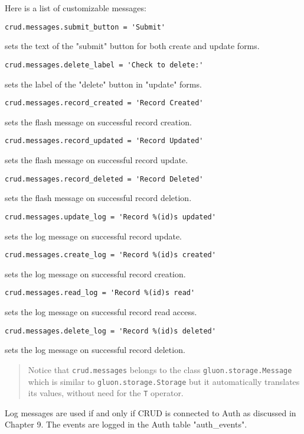 \documentclass[justified,sixbynine,notoc]{tufte-book}
\def\ft{\small\tt}
\begin{document}
\begin{fullwidth}
Here is a list of customizable messages:
\begin{lstlisting}
crud.messages.submit_button = 'Submit'
\end{lstlisting}
\noindent sets the text of the "submit" button for both create and update forms.
\begin{lstlisting}
crud.messages.delete_label = 'Check to delete:'
\end{lstlisting}
\noindent sets the label of the "delete" button in "update" forms.
\begin{lstlisting}
crud.messages.record_created = 'Record Created'
\end{lstlisting}
\noindent sets the flash message on successful record creation.
\begin{lstlisting}
crud.messages.record_updated = 'Record Updated'
\end{lstlisting}
\noindent sets the flash message on successful record update.
\begin{lstlisting}
crud.messages.record_deleted = 'Record Deleted'
\end{lstlisting}
\noindent sets the flash message on successful record deletion.
\begin{lstlisting}
crud.messages.update_log = 'Record %(id)s updated'
\end{lstlisting}
\noindent sets the log message on successful record update.
\begin{lstlisting}
crud.messages.create_log = 'Record %(id)s created'
\end{lstlisting}
\noindent sets the log message on successful record creation.
\begin{lstlisting}
crud.messages.read_log = 'Record %(id)s read'
\end{lstlisting}
\noindent sets the log message on successful record read access.
\begin{lstlisting}
crud.messages.delete_log = 'Record %(id)s deleted'
\end{lstlisting}
\noindent sets the log message on successful record deletion.

\begin{quote}Notice that {\ft crud.messages} belongs to the class {\ft gluon.storage.Message} which is similar to {\ft gluon.storage.Storage} but it automatically translates its values, without need for the {\ft T} operator.\end{quote}
Log messages are used if and only if CRUD is connected to Auth as discussed in Chapter 9. The events are logged in the Auth table "auth\_events".


\end{fullwidth}
\end{document}
